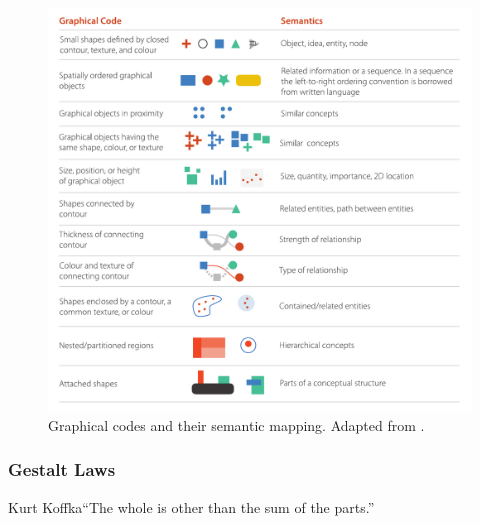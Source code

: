 \begin{figure}[h!]
\centering
\includegraphics[width=\textwidth]{images/related-work/semantic-patterns.pdf}
\caption{Graphical codes and their semantic mapping. Adapted from \cite{ware2010visual}.}
\label{fig:semantic-mappings-ware}
\end{figure}


\subsubsection{Gestalt Laws}
\label{sec:gestalt}
\begin{chapquote}{Kurt Koffka}{``The whole is other than the sum of the parts.''}
\end{chapquote}


